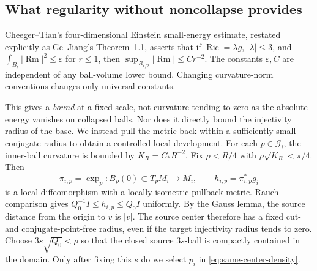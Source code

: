\documentclass[a4paper,11pt]{article}
\numberwithin{equation}{section}
\theoremstyle{definition}
\newcommand{\Ric}{\operatorname{Ric}}
\newcommand{\Rm}{\operatorname{Rm}}
\begin{document}
\subsection{What regularity without noncollapse provides}
Cheeger--Tian's four-dimensional Einstein small-energy estimate, restated explicitly as Ge--Jiang's Theorem~1.1, asserts that if $\Ric=\lambda g$, $|\lambda|\le3$, and $\int_{B_r}|\Rm|^2\le\varepsilon$ for $r\le1$, then $\sup_{B_{r/2}}|\Rm|\le Cr^{-2}$. The constants $\varepsilon,C$ are independent of any ball-volume lower bound\cite{CT2006,GJ2017}. Changing curvature-norm conventions changes only universal constants.

This gives a \emph{bound} at a fixed scale, not curvature tending to zero as the absolute energy vanishes on collapsed balls. Nor does it directly bound the injectivity radius of the base. We instead pull the metric back within a sufficiently small conjugate radius to obtain a controlled local development.
For each $p\in\mathcal G_i$, the inner-ball curvature is bounded by
$K_R=C_*R^{-2}$. Fix $\rho<R/4$ with
$\rho\sqrt{K_R}<\pi/4$. Then
\begin{equation}\label{eq:exponential-piece}
\pi_{i,p}=\exp_p:B_\rho(0)\subset T_pM_i\longrightarrow M_i,
\qquad h_{i,p}=\pi_{i,p}^*g_i
\end{equation}
is a local diffeomorphism with a locally isometric pullback metric. Rauch comparison gives
$Q_0^{-1}I\le h_{i,p}\le Q_0I$ uniformly. By the Gauss lemma, the source distance from the origin to $v$ is $|v|$. The source center therefore has a fixed cut- and conjugate-point-free radius, even if the target injectivity radius tends to zero. Choose
$3s\sqrt{Q_0}<\rho$ so that the closed source $3s$-ball is compactly contained in the domain. Only after fixing this $s$ do we select $p_i$ in \eqref{eq:same-center-density}.
\end{document}
